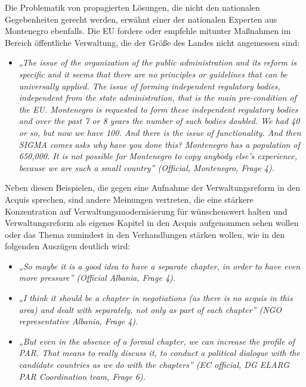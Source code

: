 Die Problematik von propagierten Lösungen, die nicht den nationalen Gegebenheiten gerecht werden, erwähnt einer der nationalen Experten aus Montenegro ebenfalls. Die EU fordere oder empfehle mitunter Maßnahmen im Bereich öffentliche Verwaltung, die der Größe des Landes nicht angemessen sind:
\begin{itemize}[label={}]
\item \textit{„The issue of the organization of the public administration and its reform is specific and it seems that there are no principles or guidelines that can be universally applied. The issue of forming independent regulatory bodies, independent from the state administration, that is the main pre-condition of the EU. Montenegro is requested to form these independent regulatory bodies and over the past 7 or 8 years the number of such bodies doubled. We had 40 or so, but now we have 100. And there is the issue of functionality. And then SIGMA comes asks why have you done this? Montenegro has a population of 650,000. It is not possible for Montenegro to copy anybody else’s experience, because we are such a small country” (Official, Montenegro, Frage 4).}
\end{itemize}

Neben diesen Beispielen, die gegen eine Aufnahme der Verwaltungsreform in den Acquis sprechen, sind andere Meinungen vertreten, die eine stärkere Konzentration auf Verwaltungsmodernisierung für wünschenswert halten und Verwaltungsreform als eigenes Kapitel in den Acquis aufgenommen sehen wollen oder das Thema zumindest in den Verhandlungen stärken wollen, wie in den folgenden Auszügen deutlich wird:
\begin{itemize}[label={}]
\item \textit{„So maybe it is a good idea to have a separate chapter, in order to have even more pressure” (Official Albania, Frage 4).}

\item \textit{ „I think it should be a chapter in negotiations (as there is no acquis in this area) and dealt with separately, not only as part of each chapter” (NGO representative Albania, Frage 4).}

\item \textit{„But even in the absence of a formal chapter, we can increase the profile of PAR. That means to really discuss it, to conduct a political dialogue with the candidate countries as we do with the chapters” (EC official, DG ELARG PAR Coordination team, Frage 6).}
\end{itemize}

